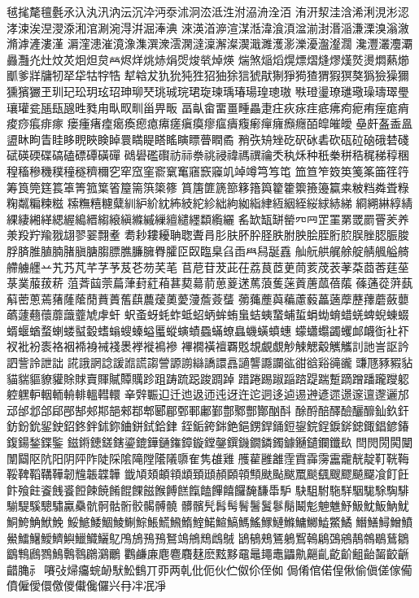 毧毮氂氊氎氶𣱿汍汛汭沄沉㳃沔沗沭泂㳒泜泩泭𣴀洀洤洦
洧汧洯洼浛浠浰涀涁涊涍涑涘𣵀𣷺𣷹𣷓涫涮涴淂洴淈淎淟
淶渶渞㴑渲湈湉湋湌湏湓湔湗湣㴞溓溧溴滃漵滫滹滻漊漌
漘漥漶漼𣽾潒潗潠潨澐澖澾澟澥澯㵤濈濉濩𤂖濼瀀瀊瀣𤄃
瀺灃灇灋㶚灥灩灮灶炆炗𤇆炟炱𤇾烬烊烑焃焆焈焌㷀焯煐
煓煞㷔熖熀熛熠熢熮熯𤎼燙燜爇㸅爴爹牂牗牣𤘩牮牯牸牿
犎𤚥犮犰狁㹠狌㹦㹨狳狺猇猒猘猙㺃猹猬猳猽獒㺔獫𤢖獮
獯獱玁玊玔玘玜玥玹玿珅珋珡珧珹琓珺琁瑓瑀瑃瑒瑝璁璈
𤩍璒璗璙璡璥璪璹璻璺瓖瓘瓫𤭖瓺𤭯甠甤甪㽗𤰖甽甾畀畈
畐畒畲畱畺畽畾疌㽵疢㽷疰疷疿痀痆痏痓痝痟痠痧痮痱瘃
瘘瘇瘏㾮𤸎瘓瘛瘜𤸷瘥瘨瘼瘳𤹪㿉癁𤺋癉癕㿗癮皕皡皠皧
皨皯𥁊盉𥁕盨𥄢眗眚眭眵𥆩䀹𥇥𥇍睘𥈞睼𥉌䁘瞚瞟瞢瞤矞
矟矤矪矬矻𥐮砅砉砍砙砬硇硪𥓙碊碔碤碝碟碻磕磦磹磺磾
𥖧礐礛礥祊祘䄅祧祲禕禡禩禴秂秇秌种秖䅈𥞩𥞴䅏稊稕稛
䅣稸穇穖穙穜穟穧穪穵窂窊窐窬𥧔䆴窹窾䆿竌竨竴𥫤𥫣𥫱
笽笪笮笯䇦䇳筿筁䇮筕筹筤筦筳𥮲䈇箐箛䈎箵箼篅篊𥱋𥱤
篔篖篚篪篰簃簎籅籊籗籞籡籩籯𥸮𥹖𥹥粦𥹢粶粷𥻘糄𥻂糍
𥻨𥼣糦𥽜糵紃䋆紒紞𥿠𥿔紽紾絀絇𦀌𥿻䋖絚絪絰䋝絿𦀗綈
綗𦁠綝綧綪綶緀緗緙緦䌂𦃭縉縐縗縝縧縬繅繵繾纆纇䌫纚
䍃缼缻缾罃㓁𦉰𦊆罣罤罭罽罾羐养𣴎羖羜羭𦐂翃翏翣翲耊
耈耖耬耰聃聦聻肙肜肤肧肸𦙾胅胕胦脍胵胻䏮脵脞䏰脤脧
脬𦜝脽䐈腩䐗䐜膅䐢膘膲臁臃臖臛𦣝臤𦣪臬臽臿𦥯舄𦧝舙
舢𦨞舼艉艅𦩘䑶䑺艗𦪌艜艣𦪷䒑艽艿芃芊芓芧芨芲芴芺芼
苢苨苷茇茈茌荔茛茝茰茼荄荗䒾䓔䒳莔莕莛莝菉菐菔菝菥
菹萕𦱳萗萹葏葑葒葙葚葜𦳝葥葸葼蒁䔍蒗蒦蒾䔈蓎蓏蓓𦹥
蓧蓪蓯蓱蓺蔛蔤蔥蔫蕏蕯䕃蕑蕡蕢𦾔蕻蕽蕿薁薆薓薝薟𦿸
𦿶𦿷薼藇藊藘藙藟藡藦藶蘀蘑蘞蘡蘤蘧𧄍蘹蘼𧄹虀虓虖虷
蚇蚉蚜蚝蚱蚳蛁蛃蛑蛕蛗蛣蛦䖸蜅蜇蜎蜐蜟蜡蜣蜱蜺蝀蝃
蝑蝘蝤蝥蝲蝼𧏛𧏚螧螉螋螓螠𧏾䗥螾𧐐蟁蟎蟟𧑉蟣蟥蟦蟪
蠓蠨蠮蠲蠼䘏衊衘𧘕𧘔衩𧘱衯袠袼裀𧚓裑裓䙁褁𧜎褷𧜣襂
襅襉𧝒襢覉覐覟覰覷觘觫䚡觳觽觿䚯訑訔𧦅訡訵訾詅詍詘
誮誐誷諗諼𧪄謊謅謍謜謭䜌譑譞譶讁讋讔讕谹𧮳谽𧮾𧯇豅
豏豗豩豭𧲸貓貒貙䝤貛賖賕𧶠賱𧸐贉贎跈跙踌䟽跽踆𨂊踔
踖踡踢踧𨂻䠖踶踹蹔蹢蹭蹯躘躞躵躻𨊂䡎𨋳輀輈輫轀轊轘
𨐌辤辴𨑕迁迆﨤迊迍迓迕迱迵迻逌逷𨕫遃遝𨗈𨗉邅邌邐邡
䢵邰邶郃郈𨛗郜郟𨛺郶郲鄀郫郾郿鄄鄆鄘鄞鄷鄹酆酇酗酙
酴酹醅醳醶釃釄𨥉𨥆釬鈁鈖鈗𨥫鉂鉊鉖鉡鉥鉨𨦈鉼鉽鉿銉
銍銗銙銟銫𨦺𨦻銲銿鋀鋆鋎鋥錑𨨞𨨩鋷錩𨩱𨩃鍑鍚鍫鍱鍳
鎡𨪙𨫍鎈鎋鎏鎞鏵𨫤𨫝鏱鏇鏜鏧鐉鐖鐗鏻鐲鐻𨯁𨯯鑭鑯镹
閆閌閍𨴐𨵱闈𨷻𨸟阬阳阴𨸶阼陡𨺉隂𨻫隚𨼲䧧隳隺隽䧺𨿸
雘雚雝䨄霔霣䨩霶靁靇靗靛靪𩊠𩊱鞖鞞鞱鞲鞾韌韑韔韘韡
韱頄頍頔頖䪼𩒐頲頳頥顇顦颫颭颰𩗏颷颻颼飂飇飋飡飣飪
飰飱飳餈䬻𩛰餖餗𩜙餚餛餜𩝐餱餺餻餼饁饆饎饠馣馦馽馿
駃駔駙駞𩣆駰駹駼騊騑騚騠騱驄驌驘䯂骯䯊骷䯒骹𩩲髆髐
髒髕髠髥髩鬌鬐鬒鬖鬜鬫鬽䰠魋魣魥魫魬魶魷鮦鮬𩷛鮲鮸
鮾鯳鯘鯝鯪鯯鯮𩸕𩺊𩹉鰖鰘鰙鰚鰝鰢鰩𩻄鰱鰷鱅鱜𩻩鱉鱊
𩻛鱔鱘鱛鱝鱟鱩鱪鱫鱭鱮鱲鱵鱺鳦鳲鴋𩿎𩿗鴑鴗鴘𪀯䳄𪀚
鴲䳑鵊鵟鵢𪃹𪂂鵳鵶鵷鶄鶙鶡鶿鶵鶹鶽鷉鷚鷠鷣䴇鸊鸂鸍
鸜鹻𢈘麀麅麛𪎌麽𪐷黟黿鼂䵷鼃鼺鼽齆齓齕齘𪗱齝𪘂齩齭
齰𪚲⺬𱍐㘔㢭㷌㿜䖾䘐䭾䰸䳡丌丣两乹仳伌伙伫伮伱侄侞
侷倄倌偌偟偢偷傎傞傢僃僨僱僾儇儌儍儎儳儸兴冄冸冺凈

